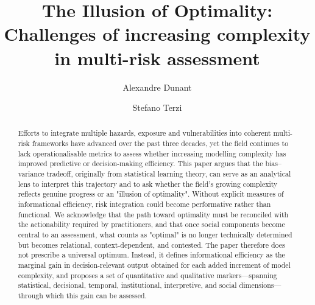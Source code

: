 \documentclass[12pt]{article}
\title{\textbf{The Illusion of Optimality: Challenges of increasing complexity in multi-risk assessment}}
\author[1]{Alexandre Dunant}
\author[1]{Stefano Terzi}
\affil[1]{EURAC Research, Bolzano, Italy}
\begin{document}
\maketitle

\begin{abstract}
Efforts to integrate multiple hazards, exposure and vulnerabilities into coherent multi-risk frameworks have advanced over the past three decades, yet the field continues to lack operationalisable metrics to assess whether increasing modelling complexity has improved predictive or decision-making efficiency. This paper argues that the bias–variance tradeoff, originally from statistical learning theory, can serve as an analytical lens to interpret this trajectory and to ask whether the field's growing complexity reflects genuine progress or an "illusion of optimality". Without explicit measures of informational efficiency, risk integration could become performative rather than functional. We acknowledge that the path toward optimality must be reconciled with the actionability required by practitioners, and that once social components become central to an assessment, what counts as "optimal" is no longer technically determined but becomes relational, context-dependent, and contested. The paper therefore does not prescribe a universal optimum. Instead, it defines informational efficiency as the marginal gain in decision-relevant output obtained for each added increment of model complexity, and proposes a set of quantitative and qualitative markers---spanning statistical, decisional, temporal, institutional, interpretive, and social dimensions---through which this gain can be assessed.

\end{abstract}
\end{document}
